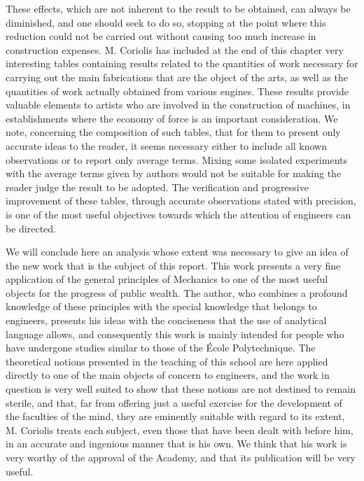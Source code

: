 \documentclass{book}
\begin{document}
These effects, which are not inherent to the result to be obtained, can always be diminished, and one should seek to do so, stopping at the point where this reduction could not be carried out without causing too much increase in construction expenses. M. Coriolis has included at the end of this chapter very interesting tables containing results related to the quantities of work necessary for carrying out the main fabrications that are the object of the arts, as well as the quantities of work actually obtained from various engines. These results provide valuable elements to artists who are involved in the construction of machines, in establishments where the economy of force is an important consideration. We note, concerning the composition of such tables, that for them to present only accurate ideas to the reader, it seems necessary either to include all known observations or to report only average terms. Mixing some isolated experiments with the average terms given by authors would not be suitable for making the reader judge the result to be adopted. The verification and progressive improvement of these tables, through accurate observations stated with precision, is one of the most useful objectives towards which the attention of engineers can be directed.

We will conclude here an analysis whose extent was necessary to give an idea of the new work that is the subject of this report. This work presents a very fine application of the general principles of Mechanics to one of the most useful objects for the progress of public wealth. The author, who combines a profound knowledge of these principles with the special knowledge that belongs to engineers, presents his ideas with the conciseness that the use of analytical language allows, and consequently this work is mainly intended for people who have undergone studies similar to those of the École Polytechnique. The theoretical notions presented in the teaching of this school are here applied directly to one of the main objects of concern to engineers, and the work in question is very well suited to show that these notions are not destined to remain sterile, and that, far from offering just a useful exercise for the development of the faculties of the mind, they are eminently suitable with regard to its extent, M. Coriolis treats each subject, even those that have been dealt with before him, in an accurate and ingenious manner that is his own. We think that his work is very worthy of the approval of the Academy, and that its publication will be very useful.
\vspace{10mm}
\end{document}

